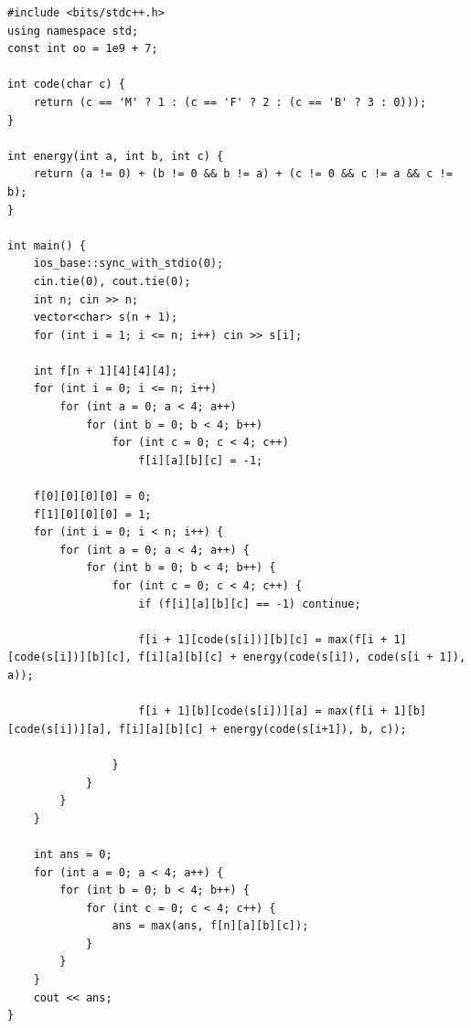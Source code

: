 \begin{lstlisting}[title=\centering\textbf{Cài đặt}]
#include <bits/stdc++.h>
using namespace std;
const int oo = 1e9 + 7;

int code(char c) {
    return (c == 'M' ? 1 : (c == 'F' ? 2 : (c == 'B' ? 3 : 0)));
}

int energy(int a, int b, int c) {
    return (a != 0) + (b != 0 && b != a) + (c != 0 && c != a && c != b);
}

int main() {
    ios_base::sync_with_stdio(0); 
    cin.tie(0), cout.tie(0);
    int n; cin >> n;
    vector<char> s(n + 1);
    for (int i = 1; i <= n; i++) cin >> s[i];

    int f[n + 1][4][4][4];
    for (int i = 0; i <= n; i++) 
        for (int a = 0; a < 4; a++)
            for (int b = 0; b < 4; b++) 
                for (int c = 0; c < 4; c++)
                    f[i][a][b][c] = -1;
                    
    f[0][0][0][0] = 0;
    f[1][0][0][0] = 1;  
    for (int i = 0; i < n; i++) {
        for (int a = 0; a < 4; a++) {
            for (int b = 0; b < 4; b++) {
                for (int c = 0; c < 4; c++) {
                    if (f[i][a][b][c] == -1) continue;

                    f[i + 1][code(s[i])][b][c] = max(f[i + 1][code(s[i])][b][c], f[i][a][b][c] + energy(code(s[i]), code(s[i + 1]), a));

                    f[i + 1][b][code(s[i])][a] = max(f[i + 1][b][code(s[i])][a], f[i][a][b][c] + energy(code(s[i+1]), b, c));

                }
            }
        }
    }

    int ans = 0;
    for (int a = 0; a < 4; a++) {
        for (int b = 0; b < 4; b++) {
            for (int c = 0; c < 4; c++) {
                ans = max(ans, f[n][a][b][c]);
            }
        }
    }
    cout << ans;
}
\end{lstlisting}


